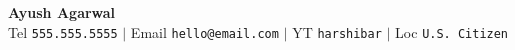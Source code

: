 \documentclass[letterpaper,11pt]{article}
\begin{document}
\begin{center}
    \textbf{\Huge Ayush Agarwal} \\ \vspace{5pt}
    \small Tel \texttt{555.555.5555} \hspace{1pt} $|$ 
    \hspace{1pt} Email \hspace{2pt} \texttt{hello@email.com} \hspace{1pt} $|$ 
    \hspace{1pt} YT \hspace{2pt} \texttt{harshibar} \hspace{1pt} $|$ 
    \hspace{1pt} Loc \hspace{2pt}\texttt{U.S. Citizen}
    \\ \vspace{-3pt}
\end{center}
\end{document}
